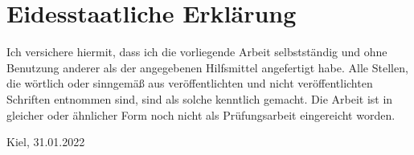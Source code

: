 \chapter*{Eidesstaatliche Erklärung}
Ich versichere hiermit, dass ich die vorliegende Arbeit selbstständig und ohne Benutzung anderer als der angegebenen Hilfsmittel angefertigt habe.
Alle Stellen, die wörtlich oder sinngemäß aus veröffentlichten und nicht veröffentlichten Schriften entnommen sind, sind als solche kenntlich gemacht.
Die Arbeit ist in gleicher oder ähnlicher Form noch nicht als Prüfungsarbeit eingereicht worden.

\vspace{4cm}
 
\hspace{0cm} Kiel, 31.01.2022  \hfill  \hspace{2cm}